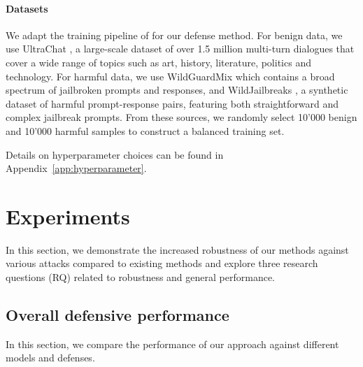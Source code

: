 \documentclass[11pt]{article}
\begin{document}
\paragraph{Datasets}
We adapt the training pipeline of \citet{yousefpour2025representationbendinglargelanguage} for our defense method.
For benign data, we use UltraChat \citep{ding2023enhancingchatlanguagemodels}, a large-scale dataset of over 1.5 million multi-turn dialogues
that cover a wide range of topics such as art, history, literature, politics and technology.
For harmful data, we use WildGuardMix \citep{han2024wildguardopenonestopmoderation} which contains a broad spectrum of jailbroken prompts and responses,
and WildJailbreaks \citep{jiang2024wildteamingscaleinthewildjailbreaks}, a synthetic dataset of harmful prompt-response pairs,
featuring both straightforward and complex jailbreak prompts.
From these sources, we randomly select 10'000 benign and 10'000 harmful samples to construct a balanced training set.

Details on hyperparameter choices can be found in Appendix~\ref{app:hyperparameter}.

\section{Experiments}

In this section, we demonstrate the increased robustness of our methods against various attacks
compared to existing methods and explore three research questions (RQ) related to robustness and general performance.

\subsection{Overall defensive performance}

In this section, we compare the performance of our approach against different models and defenses.
\end{document}
